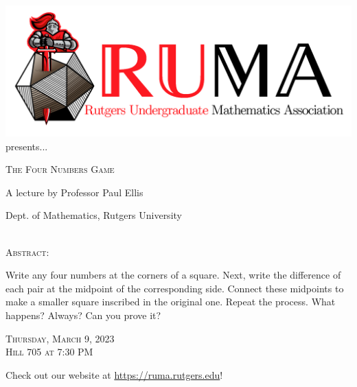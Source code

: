 \documentclass[12pt]{article}
\begin{document}

\begin{center}\includegraphics[scale=.4]{RUMAlogo.png}\\
\large  presents... \\

\vspace{1mm}
\begin{spacing}{2}
{\fontsize{32}{18}\selectfont  \textsc{
    The Four Numbers Game
    }} \end{spacing}
 
\begin{spacing}{1}
{\fontsize{24}{18} \selectfont A lecture by Professor Paul Ellis}  \end{spacing} 
\large Dept. of Mathematics, Rutgers University \\~~\\

\normalsize

\vspace{10mm}

\textsc{Abstract:}



\LARGE
Write any four numbers at the corners of a square.  Next, write the difference of each pair at the midpoint of the corresponding side.  Connect these midpoints to make a smaller square inscribed in the original one.  Repeat the process.  What happens?  Always?  Can you prove it?

\vspace{10mm}

\begin{spacing}{1.5}
    {\fontsize{24}{28}\selectfont  \textsc{
        Thursday, March 9, 2023 \\ Hill 705 at 7:30 PM}
    } 
\end{spacing}

\Large  Check out our website at 
\url{https://ruma.rutgers.edu}!
\end{center}
\end{document}
